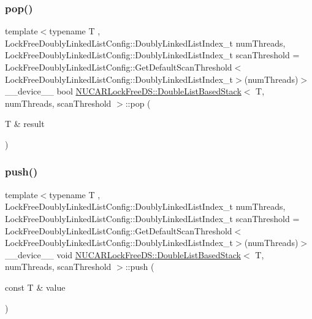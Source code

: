 \subsubsection{\texorpdfstring{pop()}{pop()}}
{\footnotesize\ttfamily template$<$typename T , Lock\+Free\+Doubly\+Linked\+List\+Config\+::\+Doubly\+Linked\+List\+Index\+\_\+t num\+Threads, Lock\+Free\+Doubly\+Linked\+List\+Config\+::\+Doubly\+Linked\+List\+Index\+\_\+t scan\+Threshold = Lock\+Free\+Doubly\+Linked\+List\+Config\+::\+Get\+Default\+Scan\+Threshold$<$\+Lock\+Free\+Doubly\+Linked\+List\+Config\+::\+Doubly\+Linked\+List\+Index\+\_\+t$>$(num\+Threads)$>$ \\
\+\_\+\+\_\+device\+\_\+\+\_\+ bool \mbox{\hyperlink{class_n_u_c_a_r_lock_free_d_s_1_1_double_list_based_stack}{N\+U\+C\+A\+R\+Lock\+Free\+D\+S\+::\+Double\+List\+Based\+Stack}}$<$ T, num\+Threads, scan\+Threshold $>$\+::pop (\begin{DoxyParamCaption}\item[{T \&}]{result }\end{DoxyParamCaption})\hspace{0.3cm}{\ttfamily [inline]}}

\mbox{\label{class_n_u_c_a_r_lock_free_d_s_1_1_double_list_based_stack_aa7be3345eca6fad8f568c3a1b9bf1fd6}} 
\subsubsection{\texorpdfstring{push()}{push()}}
{\footnotesize\ttfamily template$<$typename T , Lock\+Free\+Doubly\+Linked\+List\+Config\+::\+Doubly\+Linked\+List\+Index\+\_\+t num\+Threads, Lock\+Free\+Doubly\+Linked\+List\+Config\+::\+Doubly\+Linked\+List\+Index\+\_\+t scan\+Threshold = Lock\+Free\+Doubly\+Linked\+List\+Config\+::\+Get\+Default\+Scan\+Threshold$<$\+Lock\+Free\+Doubly\+Linked\+List\+Config\+::\+Doubly\+Linked\+List\+Index\+\_\+t$>$(num\+Threads)$>$ \\
\+\_\+\+\_\+device\+\_\+\+\_\+ void \mbox{\hyperlink{class_n_u_c_a_r_lock_free_d_s_1_1_double_list_based_stack}{N\+U\+C\+A\+R\+Lock\+Free\+D\+S\+::\+Double\+List\+Based\+Stack}}$<$ T, num\+Threads, scan\+Threshold $>$\+::push (\begin{DoxyParamCaption}\item[{const T \&}]{value }\end{DoxyParamCaption})\hspace{0.3cm}{\ttfamily [inline]}}




